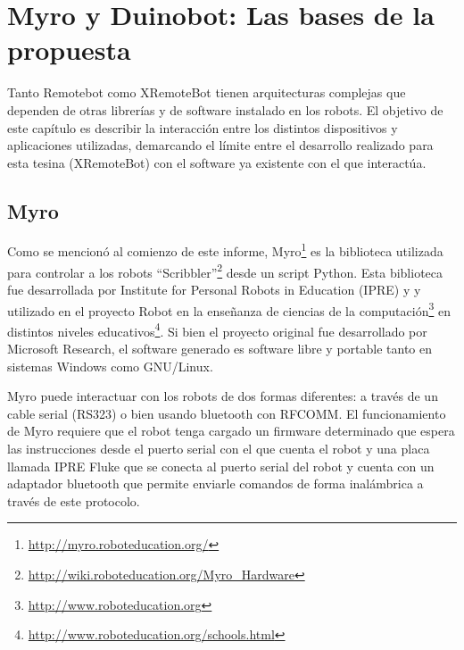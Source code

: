 \chapter{Myro y Duinobot: Las bases de la propuesta}\label{cha:arquitectura}




Tanto Remotebot como XRemoteBot tienen arquitecturas complejas que
dependen de otras librerías y de software instalado en los robots.
El objetivo de este capítulo es describir la interacción entre los
distintos dispositivos y aplicaciones utilizadas, demarcando el límite
entre el desarrollo realizado para esta tesina (XRemoteBot) con el software ya
existente con el que interactúa.

\section{Myro}\label{sec:myro}

Como se mencionó al comienzo de este informe,
Myro\footnote{\url{http://myro.roboteducation.org/}}
es la biblioteca utilizada para controlar a los robots
``Scribbler''\footnote{\url{http://wiki.roboteducation.org/Myro_Hardware}}
desde un script Python. Esta biblioteca fue desarrollada por
Institute for Personal Robots in Education (IPRE) y
y utilizado en el proyecto Robot en la enseñanza de ciencias
de la computación\footnote{\url{http://www.roboteducation.org}}
en distintos niveles
educativos\footnote{\url{http://www.roboteducation.org/schools.html}}.
Si bien el proyecto original fue desarrollado por Microsoft Research,
el software generado es software libre y portable tanto en sistemas Windows
como GNU/Linux.

Myro puede interactuar con los robots de dos
formas diferentes: a través de un cable serial (RS323) o bien usando bluetooth
con RFCOMM. El funcionamiento de Myro requiere que el robot tenga
cargado un firmware determinado que espera las instrucciones desde el puerto
serial con el que cuenta el robot y una placa llamada IPRE Fluke que se conecta
al puerto serial del robot y cuenta con un adaptador bluetooth que permite
enviarle comandos de forma inalámbrica a través de este protocolo.

